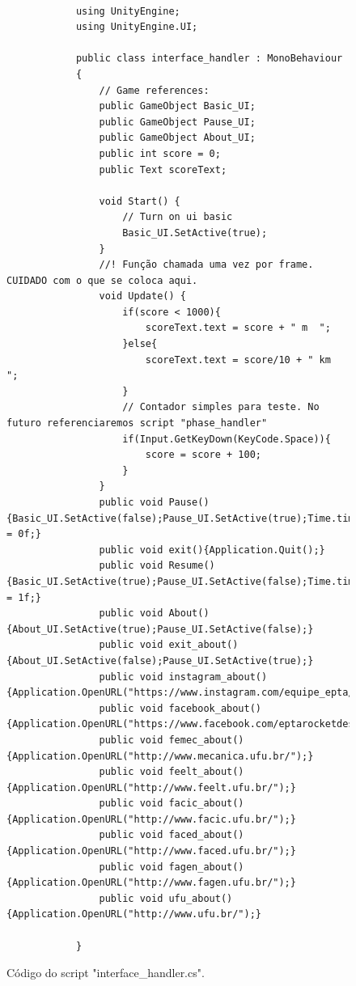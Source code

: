     \begin{figure}[ht!]
        \centering
        \begin{lstlisting}
            
            using UnityEngine;
            using UnityEngine.UI;

            public class interface_handler : MonoBehaviour
            {
                // Game references:
                public GameObject Basic_UI;
                public GameObject Pause_UI;
                public GameObject About_UI;
                public int score = 0;
                public Text scoreText;

                void Start() {
                    // Turn on ui basic
                    Basic_UI.SetActive(true);
                }
                //! Função chamada uma vez por frame. CUIDADO com o que se coloca aqui.
                void Update() {
                    if(score < 1000){
                        scoreText.text = score + " m  "; 
                    }else{
                        scoreText.text = score/10 + " km  ";
                    }
                    // Contador simples para teste. No futuro referenciaremos script "phase_handler"
                    if(Input.GetKeyDown(KeyCode.Space)){
                        score = score + 100;
                    }
                }
                public void Pause(){Basic_UI.SetActive(false);Pause_UI.SetActive(true);Time.timeScale = 0f;}
                public void exit(){Application.Quit();}
                public void Resume(){Basic_UI.SetActive(true);Pause_UI.SetActive(false);Time.timeScale = 1f;}
                public void About(){About_UI.SetActive(true);Pause_UI.SetActive(false);}
                public void exit_about(){About_UI.SetActive(false);Pause_UI.SetActive(true);}
                public void instagram_about(){Application.OpenURL("https://www.instagram.com/equipe_epta/");}
                public void facebook_about(){Application.OpenURL("https://www.facebook.com/eptarocketdesign/");}
                public void femec_about(){Application.OpenURL("http://www.mecanica.ufu.br/");}
                public void feelt_about(){Application.OpenURL("http://www.feelt.ufu.br/");}
                public void facic_about(){Application.OpenURL("http://www.facic.ufu.br/");}
                public void faced_about(){Application.OpenURL("http://www.faced.ufu.br/");}
                public void fagen_about(){Application.OpenURL("http://www.fagen.ufu.br/");}
                public void ufu_about(){Application.OpenURL("http://www.ufu.br/");}

            }

        \end{lstlisting}
        \caption{Código do script "interface\_handler.cs".}
        \label{code:interfacehandler}

    \end{figure}



